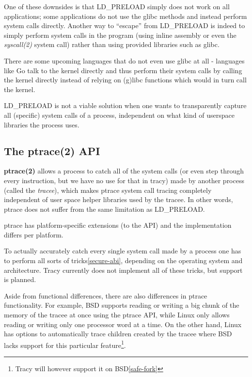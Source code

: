 \documentclass[a4paper, 10pt]{report}
\begin{document}
One of these downsides is that LD\_PRELOAD simply does not work on all
applications; some applications do not use the glibc methods and instead
perform system calls directly. Another way to ``escape'' from LD\_PRELOAD
is indeed to simply perform system calls in the program (using inline assembly
or even the \textit{syscall(2)} system call) rather than using
provided libraries such as glibc.

There are some upcoming languages that do not even use glibc at all - languages
like Go \cite{golang} talk to the kernel directly and thus perform their
system calls by calling the kernel directly instead of
relying on (g)libc functions which would in turn call the kernel.

LD\_PRELOAD is not a viable solution when one wants to transparently capture
all (specific) system calls of a process, independent on what kind of
userspace libraries the process uses.

\subsection{The ptrace(2) API}

\textbf{ptrace(2)} allows a process to catch all of the system calls (or even
step through every instruction, but we have no use for that in tracy)
made by another process (called the \textit{tracee}), which makes ptrace system
call tracing completely independent of user space helper libraries used by the
tracee. In other words, ptrace does not suffer from the same limitation as
LD\_PRELOAD.

ptrace has platform-specific extensions (to the API) and the
implementation differs per platform.

To actually accurately catch every single system call made by a process one has
to perform all sorts of tricks\ref{secure-abi}, depending on the operating
system and architecture. Tracy currently does not implement all of these
tricks, but support is planned.

Aside from functional differences, there are also differences in ptrace
functionality.
For example, BSD supports reading or writing a big chunk of the memory
of the tracee at once using the ptrace API, while Linux only allows
reading or writing only one processor word at a time.
On the other hand, Linux has options to automatically trace
children created by the tracee where BSD lacks support for
this particular feature\footnote{Tracy will however support it on
BSD\ref{safe-fork}}.
\end{document}
